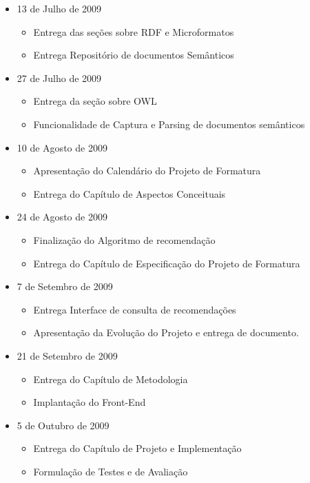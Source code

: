 \documentclass[]{article}
\begin{document}
\begin{itemize}
  \item 13 de Julho de 2009
  \begin{itemize}
    \item Entrega das seções sobre RDF e Microformatos
    \item Entrega Repositório de documentos Semânticos
  \end{itemize}
  
  \item 27 de Julho de 2009
  \begin{itemize}
    \item Entrega da seção sobre OWL
    \item Funcionalidade de Captura e Parsing de documentos semânticos
  \end{itemize}
  
  \item 10 de Agosto de 2009
  \begin{itemize}
    \item Apresentação do Calendário do Projeto de Formatura
    \item Entrega do Capítulo de Aspectos Conceituais
  \end{itemize}
  
  \item 24 de Agosto de 2009
  \begin{itemize}
    \item Finalização do Algoritmo de recomendação
    \item Entrega do Capítulo de Especificação do Projeto de Formatura
  \end{itemize}
  
  \item 7 de Setembro de 2009
  \begin{itemize}
    \item Entrega Interface de consulta de recomendações
    \item Apresentação da Evolução do Projeto e entrega de documento.
  \end{itemize}
  
  \item 21 de Setembro de 2009
  \begin{itemize}
    \item Entrega do Capítulo de Metodologia
    \item Implantação do Front-End
  \end{itemize}
  
  \item 5 de Outubro de 2009
  \begin{itemize}
    \item Entrega do Capítulo de Projeto e Implementação
    \item Formulação de Testes e de Avaliação
  \end{itemize}
  

\end{itemize}
\end{document}
